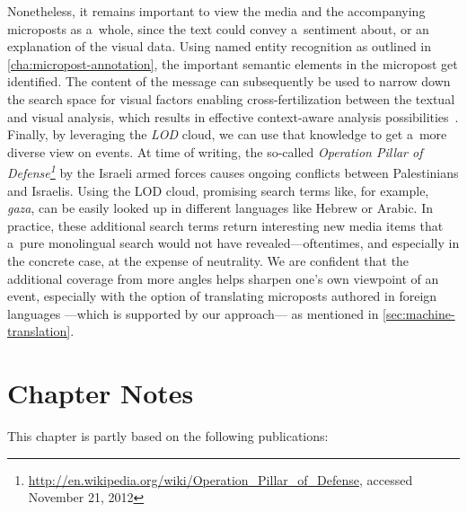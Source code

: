 Nonetheless, it remains important to view the media and the
accompanying microposts as a~whole, since the text
could convey a~sentiment about,
or an explanation of the visual data.
Using named entity recognition as outlined in
\autoref{cha:micropost-annotation},
the important semantic elements in the micropost get identified. 
The content of the message can subsequently be used
to narrow down the search space for visual factors
enabling cross-fertilization between the textual
and visual analysis, which results in effective context-aware analysis possibilities~\cite{verborgh2012multimediaannotation,rizzo2012whatfresh}.
Finally, by leveraging the \emph{LOD} cloud,
we can use that knowledge to get a~more diverse view on events.
At time of writing, the so-called
\emph{Operation Pillar of
Defense\footnote{\url{http://en.wikipedia.org/wiki/Operation_Pillar_of_Defense}, accessed November 21, 2012}}
by the Israeli armed forces
causes ongoing conflicts between Palestinians and Israelis.
Using the LOD cloud, promising search terms like, for example,
\emph{gaza}, can be easily looked up in different languages
like Hebrew or Arabic.
In practice, these additional search terms return interesting
new media items that a~pure monolingual search
would not have revealed---oftentimes,
and especially in the concrete case,
at the expense of neutrality.
We are confident that the additional coverage
from more angles helps sharpen one's own viewpoint of an event,
especially with the option of translating microposts
authored in foreign languages%
---which is supported by our approach---%
as mentioned in \autoref{sec:machine-translation}.

\section*{Chapter Notes}
This chapter is partly based on the following publications:



